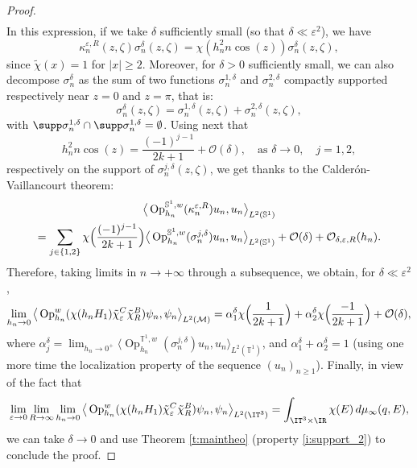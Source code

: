 \documentclass[10pt]{amsart}
\theoremstyle{plain}
\theoremstyle{definition}
\theoremstyle{remark}
\newcommand{\Op}{\operatorname{Op}}
\begin{document}
\begin{proof}
\begin{align*}
\end{align*}
In this expression, if we take $\delta$ sufficiently small (\ie so that $\delta \ll\varepsilon^2$), we have
\[
\kappa_n^{\varepsilon,R}(z,\zeta) \sigma_n^\delta(z,\zeta) = \chi(h_n^2 n \cos(z)) \sigma_n^\delta(z,\zeta),
\]
since $\tilde{\chi}(x) = 1$ for $\vert x \vert \geq 2$. Moreover, for $\delta > 0$ sufficiently small, we can also decompose $\sigma_n^\delta$ as the sum of two functions $\sigma_n^{1,\delta}$ and $\sigma_n^{2,\delta}$ compactly supported respectively near $z = 0$ and $z = \pi$, that is:
\[
\sigma_n^\delta(z,\zeta) = \sigma_n^{1,\delta}(z,\zeta) + \sigma_n^{2,\delta}(z,\zeta),
\]
with $\supp \sigma_n^{1,\delta} \cap \supp \sigma_n^{1,\delta} = \emptyset$. Using next that
\[
h_n^2 n \cos(z) = \frac{(-1)^{j-1}}{2k+1} + \mathcal{O}(\delta), \quad \text{as } \delta \to 0, \quad j = 1,2,
\]
respectively on the support of $\sigma_n^{j,\delta}(z,\zeta)$, we get thanks to the Calderón-Vaillancourt theorem:
\begin{multline*}
\big \langle \Op_{h_n}^{\mathbb{S}^1,w} (\kappa_n^{\varepsilon,R}) u_n,u_n \big \rangle_{L^2(\mathbb{S}^1)} \\
= \sum_{j\in \{1,2 \}} \chi\Bigl(\frac{(-1)^{j-1}}{2k+1} \Bigr) \big \langle \Op_{h_n}^{\mathbb{S}^1,w} (\sigma_n^{j,\delta}) u_n,u_n \big \rangle_{L^2(\mathbb{S}^1)} + \mathcal{O}(\delta) + \mathcal{O}_{\delta,\varepsilon,R}(h_n).
\end{multline*}
Therefore, taking limits in $ n \to + \infty$ through a subsequence, we obtain, for $\delta \ll \varepsilon^2$,
\[
\lim_{h_n \to 0}\big \langle \Op_{h_n}^w(\chi(h_n H_1) \tilde{\chi}_\varepsilon^C \tilde{\chi}_R^B) \psi_n, \psi_n \big \rangle_{L^2(\mathcal{M})} = \alpha_1^\delta \chi \Bigl(\frac{1}{2k+1} \Bigr) + \alpha^\delta_2\chi\Bigl(\frac{-1}{2k+1} \Bigr) + \mathcal{O}(\delta),
\]
where $\alpha_j^\delta = \lim_{h_n \to 0^+} \big \langle \Op_{h_n}^{\mathbb{T}^1,w} (\sigma_n^{j,\delta}) u_n,u_n \big \rangle_{L^2(\mathbb{T}^1)}$, and $\alpha_1^\delta + \alpha_2^\delta = 1$ (using one more time the localization property of the sequence $(u_n)_{n\geq 1}$). Finally, in view of the fact that
\[
\lim_{\varepsilon \to 0} \lim_{R \to \infty} \lim_{h_n \to 0}\big \langle \Op_{h_n}^w(\chi(h_n H_1) \tilde{\chi}_\varepsilon^C \tilde{\chi}_R^B) \psi_n, \psi_n \big \rangle_{L^2(\IT^3)} = \int_{\IT^3\times \IR} \chi(E) \, d\mu_\infty(q,E),
\]
we can take $\delta \to 0$ and use Theorem \ref{t:maintheo} (property \eqref{i:support_2}) to conclude the proof.
\end{proof}
\end{document}
